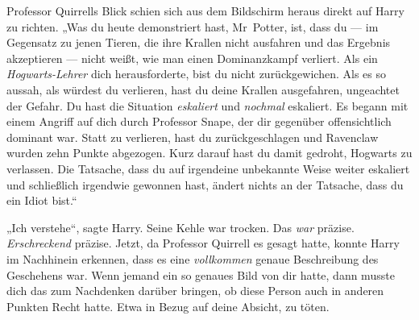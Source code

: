 Professor Quirrells Blick schien sich aus dem Bildschirm heraus direkt auf Harry zu richten.
„Was du heute demonstriert hast, Mr~Potter, ist, dass du — im Gegensatz zu jenen Tieren, die ihre Krallen nicht ausfahren und das Ergebnis akzeptieren — nicht weißt, wie man einen Dominanzkampf verliert. Als ein \emph{Hogwarts-Lehrer} dich herausforderte, bist du nicht zurückgewichen. Als es so aussah, als würdest du verlieren, hast du deine Krallen ausgefahren, ungeachtet der Gefahr. Du hast die Situation \emph{eskaliert} und \emph{nochmal} eskaliert. Es begann mit einem Angriff auf dich durch Professor Snape, der dir gegenüber offensichtlich dominant war. Statt zu verlieren, hast du zurückgeschlagen und Ravenclaw wurden zehn Punkte abgezogen. Kurz darauf hast du damit gedroht, Hogwarts zu verlassen. Die Tatsache, dass du auf irgendeine unbekannte Weise weiter eskaliert und schließlich irgendwie gewonnen hast, ändert nichts an der Tatsache, dass du ein Idiot bist.“

„Ich verstehe“, sagte Harry. Seine Kehle war trocken. Das \emph{war} präzise. \emph{Erschreckend} präzise. Jetzt, da Professor Quirrell es gesagt hatte, konnte Harry im Nachhinein erkennen, dass es eine \emph{vollkommen} genaue Beschreibung des Geschehens war. Wenn jemand ein so genaues Bild von dir hatte, dann musste dich das zum Nachdenken darüber bringen, ob diese Person auch in anderen Punkten Recht hatte. Etwa in Bezug auf deine Absicht, zu töten.

